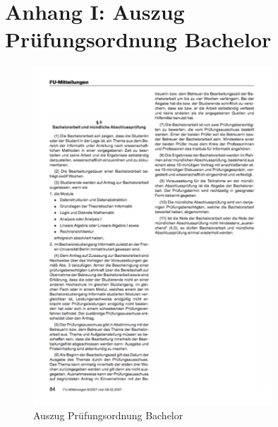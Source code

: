 \documentclass[pdftex,a4paper,12pt]{scrartcl}
\theoremstyle{definition}
\begin{document}

\newpage
{}
{}   %

\newpage 
\section*{Anhang I: Auszug Prüfungsordnung Bachelor}
\label{sec:bachelor}     
\begin{figure}[!h]
	\centering
		\includegraphics[width=0.8\textwidth]{pics/Auszug_Bachelor_Pruefungsordnung.pdf}
	\caption{Auszug Prüfungsordnung Bachelor} 
\end{figure}
\end{document}
